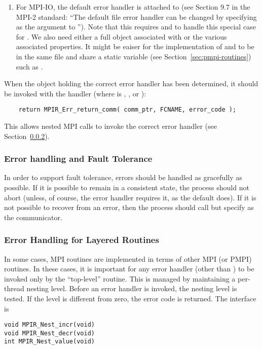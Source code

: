 \documentclass{article}
\begin{document}
\begin{enumerate}
\item For MPI-IO, the default error handler is attached to
   (see Section 9.7 in the MPI-2 standard: ``The default
  file error handler can be changed by specifying  as the
   argument to '').  Note that this
  requires  and
   to handle this special case for
  .  We also need either a full
   object associated with  or
  the various associated properties.  It might be eaiser for the
  implementation of  and
   to be in the same file and share a
  static variable (see Section~\ref{sec:pmpi-routines}) such as
  . 
\end{enumerate}

When the object holding the correct error handler has been determined, it
should be invoked with the 
 handler (where  is ,
, or ): %
\begin{verbatim}
    return MPIR_Err_return_comm( comm_ptr, FCNAME, error_code );
\end{verbatim}
This allows nested MPI calls to invoke the correct error handler (see
Section~\ref{sec:err-handling-nested}).  

\subsubsection{Error handling and Fault Tolerance}
\label{sec:errs-and-faults}
In order to support fault tolerance, errors should be handled as
gracefully as possible.  If it is possible to remain in a consistent
state, the process should not abort (unless, of course, the error
handler requires it, as the default  does).  
If it is not possible to recover from an error, then the process
should call  but specify  as the
communicator.  

\subsubsection{Error Handling for Layered Routines}
\label{sec:err-handling-nested}
In some cases, MPI routines are implemented in terms of other MPI (or
PMPI) routines.  In these cases, it is important for any error handler
(other than ) to be invoked only by the
``top-level'' routine.  
This is managed by maintaining a per-thread nesting level.  Before an error
handler is invoked, the nesting level is tested.  If the level is different
from zero, the error code is returned.  The interface is
\begin{verbatim}
void MPIR_Nest_incr(void)
void MPIR_Nest_decr(void)
int MPIR_Nest_value(void)
\end{verbatim}
\end{document}
